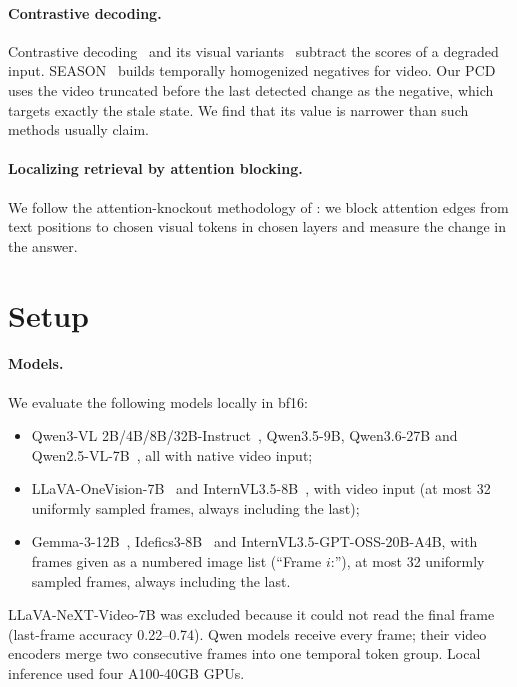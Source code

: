 \documentclass[10pt,twocolumn,letterpaper]{article}
\begin{document}
\paragraph{Contrastive decoding.} Contrastive decoding~\cite{li2023cd} and its visual variants~\cite{leng2024vcd} subtract the scores of a degraded input. SEASON~\cite{wu2025season} builds temporally homogenized negatives for video. Our PCD uses the video truncated before the last detected change as the negative, which targets exactly the stale state. We find that its value is narrower than such methods usually claim.

\paragraph{Localizing retrieval by attention blocking.} We follow the attention-knockout methodology of \citet{geva2023dissecting}: we block attention edges from text positions to chosen visual tokens in chosen layers and measure the change in the answer.

\section{Setup}
\label{sec:setup}

\paragraph{Models.} We evaluate the following models locally in bf16:
\begin{itemize}
  \item Qwen3-VL 2B/4B/8B/32B-Instruct~\cite{bai2025qwen3vl}, Qwen3.5-9B, Qwen3.6-27B and Qwen2.5-VL-7B~\cite{bai2025qwen25vl}, all with native video input;
  \item LLaVA-OneVision-7B~\cite{li2024llavaov} and InternVL3.5-8B~\cite{wang2025internvl35}, with video input (at most 32 uniformly sampled frames, always including the last);
  \item Gemma-3-12B~\cite{gemma2025gemma3}, Idefics3-8B~\cite{laurencon2024idefics3} and InternVL3.5-GPT-OSS-20B-A4B, with frames given as a numbered image list (``Frame $i$:''), at most 32 uniformly sampled frames, always including the last.
\end{itemize}
LLaVA-NeXT-Video-7B was excluded because it could not read the final frame (last-frame accuracy 0.22--0.74). Qwen models receive every frame; their video encoders merge two consecutive frames into one temporal token group. Local inference used four A100-40GB GPUs.
\end{document}
